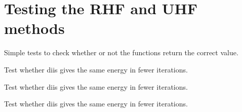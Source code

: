 \documentclass[letterpaper,10pt,english]{sphinxmanual}
\begin{document}
\label{\detokenize{tests:module-hf.tests.test_auth}}

\chapter{Testing the RHF and UHF methods}
\label{\detokenize{tests:testing-the-rhf-and-uhf-methods}}\label{\detokenize{tests::doc}}
Simple tests to check whether or not the functions return the correct value.

\begin{fulllineitems}
\label{\detokenize{tests:hf.tests.test_auth.test_diis_real_ghf}}
Test whether diis gives the same energy in fewer iterations.

\end{fulllineitems}


\begin{fulllineitems}
\label{\detokenize{tests:hf.tests.test_auth.test_diis_rhf}}
Test whether diis gives the same energy in fewer iterations.

\end{fulllineitems}


\begin{fulllineitems}
\label{\detokenize{tests:hf.tests.test_auth.test_diis_uhf}}
Test whether diis gives the same energy in fewer iterations.

\end{fulllineitems}

\end{document}
